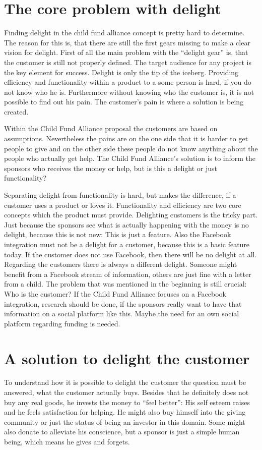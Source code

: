 \section{The core problem with delight}
Finding delight in the child fund alliance concept is pretty hard to determine. The reason for this is, that there are still the first gears missing to make a clear vision for delight. First of all the main problem with the “delight gear” is, that the customer is still not properly defined. The target audience for any project is the key element for success. Delight is only the tip of the iceberg. Providing efficiency and functionality within a product to a some person is hard, if you do not know who he is. Furthermore without knowing who the customer is, it is not possible to find out his pain. The customer's pain is where a solution is being created. 

Within the Child Fund Alliance proposal the customers are based on assumptions. Nevertheless the pains are on the one side that it is harder to get people to give and on the other side these people do not know anything about the people who actually get help. The Child Fund Alliance's solution is to inform the sponsors who receives the money or help, but is this a delight or just functionality?

Separating delight from functionality is hard, but makes the difference, if a customer uses a product or loves it. Functionality and efficiency are two core concepts which the product must provide. Delighting customers is the tricky part. Just because the sponsors see what is actually happening with the money is no delight, because this is not new: This is just a feature. Also the Facebook integration must not be a delight for a customer, because this is a basic feature today. If the customer does not use Facebook, then there will be no delight at all. Regarding the customers there is always a different delight. Someone might benefit from a Facebook stream of information, others are just fine with a letter from a child. The problem that was mentioned in the beginning is still crucial: Who is the customer? If the Child Fund Alliance focuses on a Facebook integration, research should be done, if the sponsors really want to have that information on a social platform like this. Maybe the need for an own social platform regarding funding is needed.

\section{A solution to delight the customer}
To understand how it is possible to delight the customer the question must be answered, what the customer actually buys. Besides that he definitely does not buy any real goods, he invests the money to “feel better”: His self esteem raises and he feels satisfaction for helping. He might also buy himself into the giving community or just the status of being an investor in this domain. Some might also donate to alleviate his conscience, but a sponsor is just a simple human being, which means he gives and forgets.

